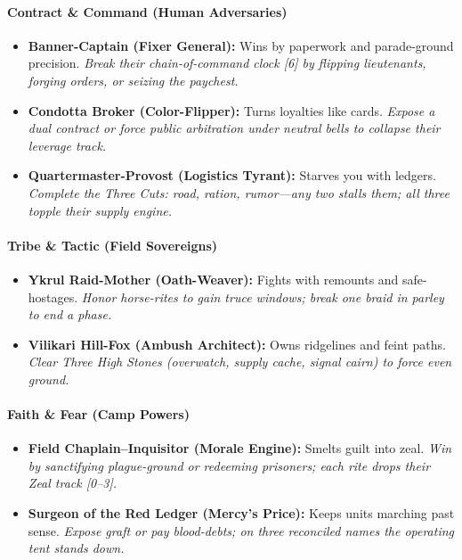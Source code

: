 \paragraph{Contract \& Command (Human Adversaries)}
\begin{itemize}
  \item \textbf{Banner-Captain (Fixer General):} Wins by paperwork and parade-ground precision. \emph{Break their chain-of-command clock [6] by flipping lieutenants, forging orders, or seizing the paychest.}
  \item \textbf{Condotta Broker (Color-Flipper):} Turns loyalties like cards. \emph{Expose a dual contract or force public arbitration under neutral bells to collapse their leverage track.}
  \item \textbf{Quartermaster-Provost (Logistics Tyrant):} Starves you with ledgers. \emph{Complete the \textit{Three Cuts}: road, ration, rumor—any two stalls them; all three topple their supply engine.}
\end{itemize}

\paragraph{Tribe \& Tactic (Field Sovereigns)}
\begin{itemize}
  \item \textbf{Ykrul Raid-Mother (Oath-Weaver):} Fights with remounts and safe-hostages. \emph{Honor horse-rites to gain truce windows; break one braid in parley to end a phase.}
  \item \textbf{Vilikari Hill-Fox (Ambush Architect):} Owns ridgelines and feint paths. \emph{Clear \textit{Three High Stones} (overwatch, supply cache, signal cairn) to force even ground.}
\end{itemize}

\paragraph{Faith \& Fear (Camp Powers)}
\begin{itemize}
  \item \textbf{Field Chaplain–Inquisitor (Morale Engine):} Smelts guilt into zeal. \emph{Win by sanctifying plague-ground or redeeming prisoners; each rite drops their Zeal track [0–3].}
  \item \textbf{Surgeon of the Red Ledger (Mercy’s Price):} Keeps units marching past sense. \emph{Expose graft or pay blood-debts; on three reconciled names the operating tent stands down.}
\end{itemize}

